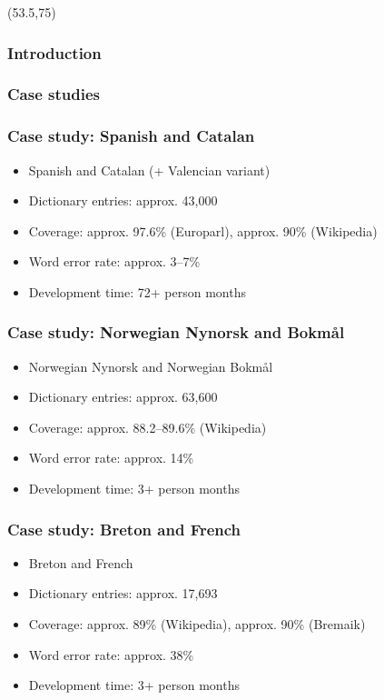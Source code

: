 \documentclass{beamer} %
\date{2nd--13th November, 2015}
\title{\cyrtext{Раздел 8: Планирование проекта}}
\newcommand{\MyLogoBottomCentred}{
\begin{textblock}{14}(53.5,75)
  \pgfuseimage{logo}
\end{textblock}
}
\begin{document}
\begin{frame}
        \titlepage
\MyLogoBottomCentred
\end{frame}


\begin{frame}
  \frametitle{Introduction}

\end{frame}


\begin{frame}
  \frametitle{Case studies}

\end{frame}

\begin{frame}
  \frametitle{Case study: Spanish and Catalan}

\begin{itemize}
  \item Spanish and Catalan (+ Valencian variant)
  \item Dictionary entries: approx. 43,000
  \item Coverage: approx. 97.6\% (Europarl), approx. 90\% (Wikipedia)
  \item Word error rate: approx. 3--7\%
  \item Development time: 72+ person months 
\end{itemize}

\end{frame}

\begin{frame}
  \frametitle{Case study: Norwegian Nynorsk and Bokmål}

\begin{itemize}
  \item Norwegian Nynorsk and Norwegian Bokmål
  \item Dictionary entries: approx. 63,600
  \item Coverage: approx. 88.2--89.6\% (Wikipedia)
  \item Word error rate: approx. 14\%
  \item Development time: 3+ person months 
\end{itemize}

\end{frame}

\begin{frame}
  \frametitle{Case study: Breton and French}

\begin{itemize}
  \item Breton and French
  \item Dictionary entries: approx. 17,693
  \item Coverage: approx. 89\% (Wikipedia), approx. 90\% (Bremaik)
  \item Word error rate: approx. 38\%
  \item Development time: 3+ person months 
\end{itemize}

\end{frame}
\end{document}

